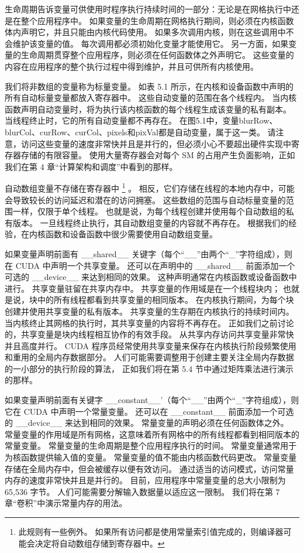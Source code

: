 生命周期告诉变量可供使用时程序执行持续时间的一部分：无论是在网格执行中还是在整个应用程序中。 
如果变量的生命周期在网格执行期间，则必须在内核函数体内声明它，并且只能由内核代码使用。 
如果多次调用内核，则在这些调用中不会维护该变量的值。 每次调用都必须初始化变量才能使用它。 
另一方面，如果变量的生命周期贯穿整个应用程序，则必须在任何函数体之外声明它。 
这些变量的内容在应用程序的整个执行过程中得到维护，并且可供所有内核使用。

我们将非数组的变量称为标量变量。 如表 5.1 所示，在内核和设备函数中声明的所有自动标量变量都放入寄存器中。 
这些自动变量的范围在各个线程内。 当内核函数声明自动变量时，将为执行该内核函数的每个线程生成该变量的私有副本。 
当线程终止时，它的所有自动变量都不再存在。 
在图5.1中，变量blurRow、blurCol、curRow、curCol、pixels和pixVal都是自动变量，属于这一类。 
请注意，访问这些变量的速度非常快并且是并行的，但必须小心不要超出硬件实现中寄存器存储的有限容量。 
使用大量寄存器会对每个 SM 的占用产生负面影响，正如我们在第 4 章“计算架构和调度”中看到的那样。

自动数组变量不存储在寄存器中
\footnote{此规则有一些例外。 如果所有访问都是使用常量索引值完成的，则编译器可能会决定将自动数组存储到寄存器中。} 。
相反，它们存储在线程的本地内存中，可能会导致较长的访问延迟和潜在的访问拥塞。 
这些数组的范围与自动标量变量的范围一样，仅限于单个线程。 也就是说，为每个线程创建并使用每个自动数组的私有版本。 
一旦线程终止执行，其自动数组变量的内容就不再存在。 根据我们的经验，在内核函数和设备函数中很少需要使用自动数组变量。

如果变量声明前面有 \_\_shared\_\_ 关键字（每个“\_\_”由两个“\_”字符组成），则在 CUDA 中声明一个共享变量。 
还可以在声明中的 \_\_shared\_\_ 前面添加一个可选的 \_\_device\_\_ 来达到相同的效果。 
这种声明通常在内核函数或设备函数中进行。 共享变量驻留在共享内存中。 共享变量的作用域是在一个线程块内； 
也就是说，块中的所有线程都看到共享变量的相同版本。 在内核执行期间，为每个块创建并使用共享变量的私有版本。 
共享变量的生存期在内核执行的持续时间内。 当内核终止其网格的执行时，其共享变量的内容将不再存在。 
正如我们之前讨论的，共享变量是块内线程相互协作的有效手段。 从共享内存访问共享变量非常快并且高度并行。 
CUDA 程序员经常使用共享变量来保存在内核执行阶段频繁使用和重用的全局内存数据部分。 
人们可能需要调整用于创建主要关注全局内存数据的一小部分的执行阶段的算法，
正如我们将在第 5.4 节中通过矩阵乘法进行演示的那样。

如果变量声明前面有关键字 \_\_constant\_\_'（每个“\_\_”由两个“\_”字符组成），则它在 CUDA 中声明一个常量变量。 
还可以在 \_\_constant\_\_ 前面添加一个可选的 \_\_device\_\_ 来达到相同的效果。 常量变量的声明必须在任何函数体之外。 
常量变量的作用域是所有网格，这意味着所有网格中的所有线程都看到相同版本的常量变量。 
常量变量的生命周期是整个应用程序执行的时间。 常量变量通常用于为核函数提供输入值的变量。 
常量变量的值不能由内核函数代码更改。 常量变量存储在全局内存中，但会被缓存以便有效访问。 
通过适当的访问模式，访问常量内存的速度非常快并且是并行的。 目前，应用程序中常量变量的总大小限制为 65,536 字节。 
人们可能需要分解输入数据量以适应这一限制。 我们将在第 7 章“卷积”中演示常量内存的用法。

